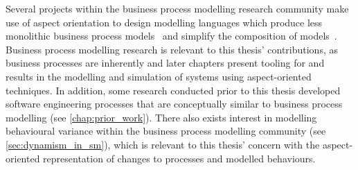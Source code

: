 Several projects within the business process modelling research community make
use of aspect orientation to design modelling languages which produce less
monolithic business process models~\cite{Cappelli_AOBPM,da2020implementation}
and simplify the composition of models~\cite{charfi2007ao4bpel}. Business
process modelling research is relevant to this thesis' contributions, as
business processes are inherently \sociotechnical and later chapters present
tooling for and results in the modelling and simulation of \sociotechnical
systems using aspect-oriented techniques. In addition, some research conducted
prior to this thesis developed software engineering processes that are
conceptually similar to business process modelling (see \cref{chap:prior_work}).
There also exists interest in modelling behavioural variance within the business
process modelling community (see \cref{sec:dynamism_in_sm}), which is relevant
to this thesis' concern with the aspect-oriented representation of changes to
processes and modelled behaviours.


